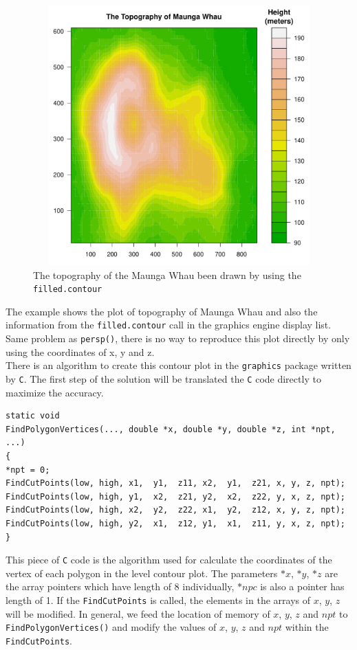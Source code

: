 \documentclass[paper=a4, fontsize=11pt]{report}
\begin{document}
\begin{figure}[h]
	\begin{center}
		\includegraphics[height = 10cm, width = 12cm]{figure/filled_example_1.pdf}
		\caption{The topography of the Maunga Whau been drawn by using the \texttt{filled.contour}}
		\label{figure_3.6}
	\end{center}
\end{figure}
The example shows the plot of topography of Maunga Whau and also the information from the \texttt{filled.contour} call in the graphics engine display list. Same problem as \texttt{persp()}, there is no way to reproduce this plot directly by only using the coordinates of x, y and z.\\

There is an algorithm to create this contour plot in the \texttt{graphics} package written by \texttt{C}. The first step of the solution will be translated the \texttt{C} code directly to maximize the accuracy.\\

\begin{lstlisting}
static void
FindPolygonVertices(..., double *x, double *y, double *z, int *npt, ...)
{
*npt = 0;
FindCutPoints(low, high, x1,  y1,  z11, x2,  y1,  z21, x, y, z, npt);
FindCutPoints(low, high, y1,  x2,  z21, y2,  x2,  z22, y, x, z, npt);
FindCutPoints(low, high, x2,  y2,  z22, x1,  y2,  z12, x, y, z, npt);
FindCutPoints(low, high, y2,  x1,  z12, y1,  x1,  z11, y, x, z, npt);
}
\end{lstlisting}
This piece of \texttt{C} code is the algorithm used for calculate the coordinates of the vertex of each polygon in the level contour plot. The parameters $*x$, $*y$, $*z$ are the array pointers which have length of 8 individually, $*npc$ is also a pointer has length of 1. If the \texttt{FindCutPoints} is called, the elements in the arrays of $x$, $y$, $z$ will be modified. In general, we feed the location of memory of $x$, $y$, $z$ and $npt$ to \texttt{FindPolygonVertices()} and modify the values of $x$, $y$, $z$ and $npt$ within the \texttt{FindCutPoints}.\\
\end{document}
